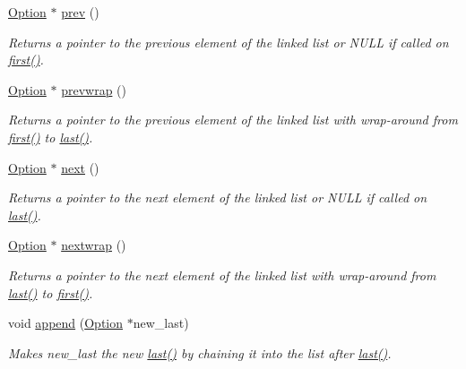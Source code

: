 \begin{DoxyCompactItemize}
\hyperlink{classoption_1_1Option}{Option} $\ast$ \hyperlink{classoption_1_1Option_a4d12001a91b0b35cf47437d0c60d2b52}{prev} ()
\begin{DoxyCompactList}\small\item\em Returns a pointer to the previous element of the linked list or N\+U\+LL if called on \hyperlink{classoption_1_1Option_abb4e13cd7c90999c8a6b1f871cece283}{first()}. \end{DoxyCompactList}\item 
\hyperlink{classoption_1_1Option}{Option} $\ast$ \hyperlink{classoption_1_1Option_a1226e45dc2de30f269b2aff1784bbee7}{prevwrap} ()
\begin{DoxyCompactList}\small\item\em Returns a pointer to the previous element of the linked list with wrap-\/around from \hyperlink{classoption_1_1Option_abb4e13cd7c90999c8a6b1f871cece283}{first()} to \hyperlink{classoption_1_1Option_afe2aff68191e55b59c53fac3dbbcd7c3}{last()}. \end{DoxyCompactList}\item 
\hyperlink{classoption_1_1Option}{Option} $\ast$ \hyperlink{classoption_1_1Option_a59ae9aed505f4d410633bb36478a32be}{next} ()
\begin{DoxyCompactList}\small\item\em Returns a pointer to the next element of the linked list or N\+U\+LL if called on \hyperlink{classoption_1_1Option_afe2aff68191e55b59c53fac3dbbcd7c3}{last()}. \end{DoxyCompactList}\item 
\hyperlink{classoption_1_1Option}{Option} $\ast$ \hyperlink{classoption_1_1Option_ae8d8c058af3c781cb1d444998df48fef}{nextwrap} ()
\begin{DoxyCompactList}\small\item\em Returns a pointer to the next element of the linked list with wrap-\/around from \hyperlink{classoption_1_1Option_afe2aff68191e55b59c53fac3dbbcd7c3}{last()} to \hyperlink{classoption_1_1Option_abb4e13cd7c90999c8a6b1f871cece283}{first()}. \end{DoxyCompactList}\item 
void \hyperlink{classoption_1_1Option_a59030822a1ec4e667e6c288d7e5ec961}{append} (\hyperlink{classoption_1_1Option}{Option} $\ast$new\+\_\+last)
\begin{DoxyCompactList}\small\item\em Makes {\ttfamily new\+\_\+last} the new \hyperlink{classoption_1_1Option_afe2aff68191e55b59c53fac3dbbcd7c3}{last()} by chaining it into the list after \hyperlink{classoption_1_1Option_afe2aff68191e55b59c53fac3dbbcd7c3}{last()}. \end{DoxyCompactList}\item 

\end{DoxyCompactItemize}
